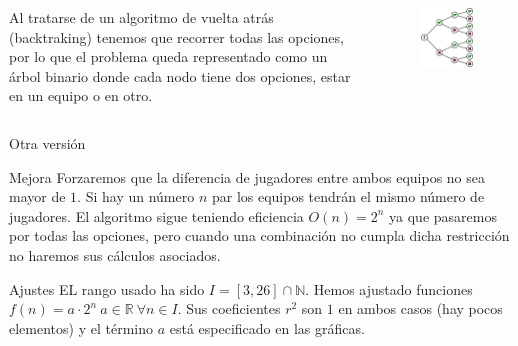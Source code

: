 \begin{frame}
	\begin{columns}
	Al tratarse de un algoritmo de vuelta atrás (backtraking) tenemos que recorrer todas las 
	opciones, por lo que el problema queda representado como un árbol binario donde cada nodo 
	tiene dos opciones, estar en un equipo o en otro.
	
	\begin{figure}[H]
    		\includegraphics[scale=0.65]{./Imagenes/arbolbin.png}
	\end{figure}		
	\end{columns}
\end{frame}


\begin{frame}{Otra versión}
	\begin{block}{Mejora}
	Forzaremos que la diferencia de jugadores entre ambos equipos no sea mayor de $1$. 
	Si hay un número $n$ par los equipos tendrán el mismo número de jugadores. 
	El algoritmo sigue teniendo eficiencia $O(n)=2^n$ ya que pasaremos por todas las opciones, pero
	cuando una combinación no cumpla dicha restricción no haremos sus cálculos asociados.	
	\end{block}

	\begin{alertblock}{Ajustes}
	EL rango usado ha sido $I=[3,26]\cap\mathbb{N}$.
	Hemos ajustado funciones $f(n)=a \cdot 2^n\ a\in\mathbb{R}	\ \forall n\in I$. 
	Sus coeficientes $r^2$ son $1$ en ambos casos (hay pocos elementos) y el 	
	término $a$ está especificado en las gráficas.
	\end{alertblock}
\end{frame}


